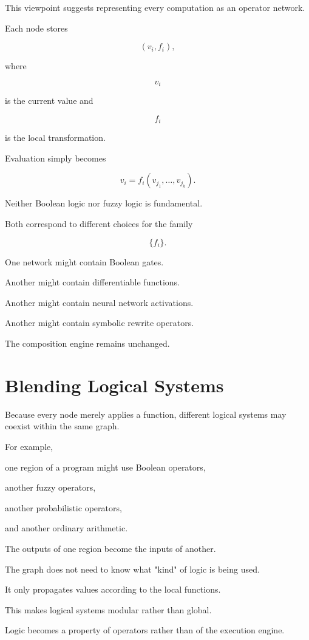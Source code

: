 \documentclass[12pt,oneside]{article}
\begin{document}
This viewpoint suggests representing every computation as an operator network.

Each node stores

\[
(v_i,f_i),
\]

where

\[
v_i
\]

is the current value and

\[
f_i
\]

is the local transformation.

Evaluation simply becomes

\[
v_i
=
f_i(v_{j_1},\ldots,v_{j_k}).
\]

Neither Boolean logic nor fuzzy logic is fundamental.

Both correspond to different choices for the family

\[
\{f_i\}.
\]

One network might contain Boolean gates.

Another might contain differentiable functions.

Another might contain neural network activations.

Another might contain symbolic rewrite operators.

The composition engine remains unchanged.

\section{Blending Logical Systems}

Because every node merely applies a function, different logical systems may coexist within the same graph.

For example,

one region of a program might use Boolean operators,

another fuzzy operators,

another probabilistic operators,

and another ordinary arithmetic.

The outputs of one region become the inputs of another.

The graph does not need to know what "kind" of logic is being used.

It only propagates values according to the local functions.

This makes logical systems modular rather than global.

Logic becomes a property of operators rather than of the execution engine.
\end{document}
